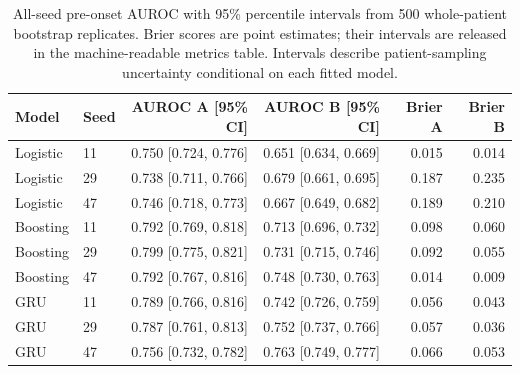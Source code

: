 \begin{table}[t]\centering\small
\caption{All-seed pre-onset AUROC with 95\% percentile intervals from 500 whole-patient bootstrap replicates. Brier scores are point estimates; their intervals are released in the machine-readable metrics table. Intervals describe patient-sampling uncertainty conditional on each fitted model.}

\begin{tabular}{llrrrr}\toprule
Model & Seed & AUROC A [95\% CI] & AUROC B [95\% CI] & Brier A & Brier B\\\midrule
Logistic & 11 & 0.750 [0.724, 0.776] & 0.651 [0.634, 0.669] & 0.015 & 0.014 \\
Logistic & 29 & 0.738 [0.711, 0.766] & 0.679 [0.661, 0.695] & 0.187 & 0.235 \\
Logistic & 47 & 0.746 [0.718, 0.773] & 0.667 [0.649, 0.682] & 0.189 & 0.210 \\
Boosting & 11 & 0.792 [0.769, 0.818] & 0.713 [0.696, 0.732] & 0.098 & 0.060 \\
Boosting & 29 & 0.799 [0.775, 0.821] & 0.731 [0.715, 0.746] & 0.092 & 0.055 \\
Boosting & 47 & 0.792 [0.767, 0.816] & 0.748 [0.730, 0.763] & 0.014 & 0.009 \\
GRU & 11 & 0.789 [0.766, 0.816] & 0.742 [0.726, 0.759] & 0.056 & 0.043 \\
GRU & 29 & 0.787 [0.761, 0.813] & 0.752 [0.737, 0.766] & 0.057 & 0.036 \\
GRU & 47 & 0.756 [0.732, 0.782] & 0.763 [0.749, 0.777] & 0.066 & 0.053 \\
\bottomrule\end{tabular}\end{table}
